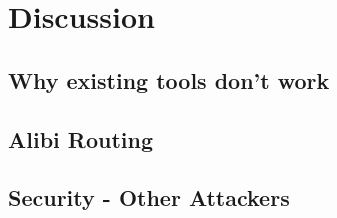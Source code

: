 \section{Discussion}

\subsection{Why existing tools don't work}

\subsection{Alibi Routing}

\subsection{Security - Other Attackers}
